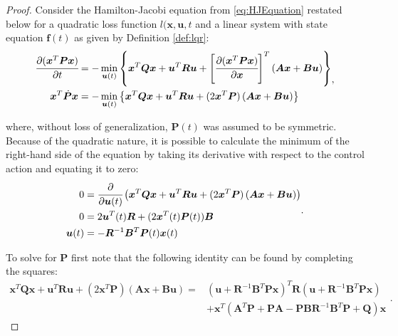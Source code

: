 \documentclass[a4paper,11pt]{book}
\numberwithin{figure}{chapter}
\numberwithin{equation}{chapter}
\numberwithin{table}{chapter}
\theoremstyle{definition}
\begin{document}
\begin{proof}
    Consider the Hamilton-Jacobi equation from \eqref{eq:HJEquation} restated below for a quadratic loss function $l(\bm{x}, \bm{u}, t$ and a linear system with state equation $\bm{f}(t)$ as given by Definition \ref{def:lqr}:
    \begin{equation}
    \begin{split}
        \cfrac{\partial (\bm{x}^T \bm{P} \bm{x})}{\partial t} &=  - \min_{\bm{u}(t)} \left\{ \bm{x}^T \bm{Q} \bm{x} + \bm{u}^T \bm{R} \bm{u} + \left[ \cfrac{\partial (\bm{x}^T \bm{P} \bm{x})}{\partial \bm{x}} \right]^T \left( \bm{A} \bm{x} + \bm{B} \bm{u} \right) \right\} \\
        \bm{x}^T \dot{\bm{P}} \bm{x} &= - \min_{\bm{u}(t)} \left\{ \bm{x}^T \bm{Q} \bm{x} + \bm{u}^T \bm{R} \bm{u} + (2 \bm{x}^T \bm{P}) \left( \bm{A} \bm{x} + \bm{B} \bm{u} \right) \right\}
    \end{split}
    ,\end{equation}
    
    \noindent where, without loss of generalization, $\bm{P}(t)$ was assumed to be symmetric. Because of the quadratic nature, it is possible to calculate the minimum of the right-hand side of the equation by taking its derivative with respect to the control action and equating it to zero:
    \begin{equation}
    \begin{split}
        0 &= \cfrac{\partial}{\partial \bm{u}(t)} \left( \bm{x}^T \bm{Q} \bm{x} + \bm{u}^T \bm{R} \bm{u} + (2 \bm{x}^T \bm{P}) \left( \bm{A} \bm{x} + \bm{B} \bm{u} \right) \right) \\
        0 &= 2 \bm{u}^T(t) \bm{R} + (2 \bm{x}^T(t) \bm{P}(t)) \bm{B} \\
        \bm{u}(t) &= - \bm{R}^{-1}  \bm{B}^T \bm{P}(t) \bm{x}(t)
    \end{split}
    .\end{equation}
    
    To solve for $\bm{P}$ first note that the following identity can be found by completing the squares:
    \begin{equation}
    \begin{split}
        \bm{x}^T \bm{Q} \bm{x} + \bm{u}^T \bm{R} \bm{u} + (2 \bm{x}^T \bm{P}) \left( \bm{A} \bm{x} + \bm{B} \bm{u} \right) = & (\bm{u} + \bm{R}^{-1} \bm{B}^T \bm{P} \bm{x})^T \bm{R} (\bm{u} + \bm{R}^{-1} \bm{B}^T \bm{P} \bm{x}) \\ & + \bm{x}^T (\bm{A}^T \bm{P} + \bm{P} \bm{A} - \bm{P} \bm{B} \bm{R}^{-1} \bm{B}^T \bm{P} + \bm{Q}) \bm{x}
    \end{split}
    .\end{equation}
    

\end{proof}
\end{document}

